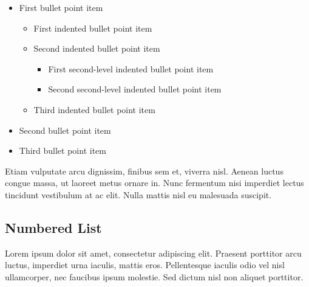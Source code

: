 \documentclass[
	a4paper, %
	12pt, %
]{CSSullivanBusinessReport}
\begin{document}
\begin{itemize}
	\item First bullet point item
	\begin{itemize}
		\item First indented bullet point item
		\item Second indented bullet point item
		\begin{itemize}
			\item First second-level indented bullet point item
			\item Second second-level indented bullet point item
		\end{itemize}
		\item Third indented bullet point item
	\end{itemize}
	\item Second bullet point item
	\item Third bullet point item
\end{itemize}

Etiam vulputate arcu dignissim, finibus sem et, viverra nisl. Aenean luctus congue massa, ut laoreet metus ornare in. Nunc fermentum nisi imperdiet lectus tincidunt vestibulum at ac elit. Nulla mattis nisl eu malesuada suscipit.


\subsection{Numbered List}

Lorem ipsum dolor sit amet, consectetur adipiscing elit. Praesent porttitor arcu luctus, imperdiet urna iaculis, mattis eros. Pellentesque iaculis odio vel nisl ullamcorper, nec faucibus ipsum molestie. Sed dictum nisl non aliquet porttitor.
\end{document}
